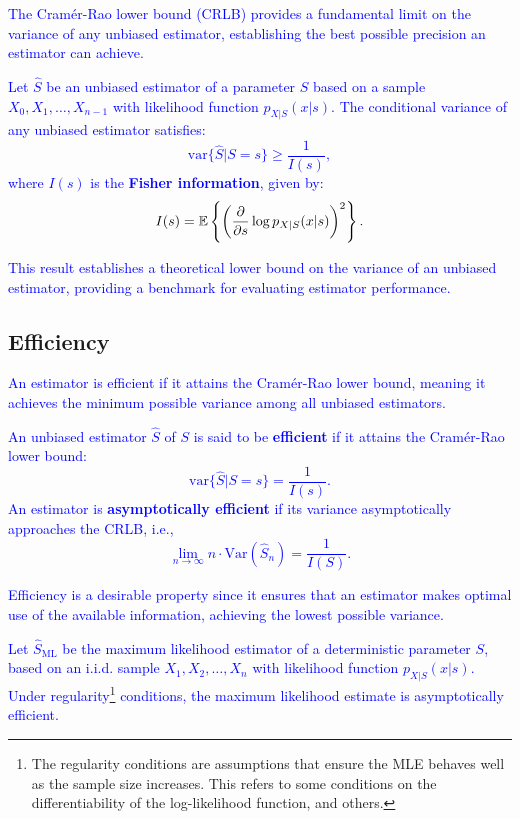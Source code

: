 \textcolor{blue}{The Cramér-Rao lower bound (CRLB) provides a fundamental limit on the variance of any unbiased estimator, establishing the best possible precision an estimator can achieve.
\begin{theorem}
Let $\hat{S}$ be an unbiased estimator of a parameter $S$ based on a sample $X_0, X_1, \dots, X_{n-1}$ with likelihood function $p_{X|S}(x|s)$. The conditional variance of any unbiased estimator satisfies:
\begin{equation}
\text{var}\{\hat{S}|S=s\} \geq \frac{1}{I(s)},
\end{equation}
where $I(s)$ is the \textbf{Fisher information}, given by:
\begin{equation}
I(s) = \mathbb{E} \left\{ \left( \frac{\partial}{\partial s} \log p_{X|S}(x|s) \right)^2 \right\}.
\end{equation}
\end{theorem}
This result establishes a theoretical lower bound on the variance of an unbiased estimator, providing a benchmark for evaluating estimator performance.}

\subsection{Efficiency}

\textcolor{blue}{An estimator is efficient if it attains the Cramér-Rao lower bound, meaning it achieves the minimum possible variance among all unbiased estimators.
\begin{definition}[Efficiency]
An unbiased estimator $\hat{S}$ of $S$ is said to be \textbf{efficient} if it attains the Cramér-Rao lower bound:
\begin{equation}
\text{var}\{\hat{S}|S=s\} = \frac{1}{I(s)}.
\end{equation}
An estimator is \textbf{asymptotically efficient} if its variance asymptotically approaches the CRLB, i.e.,
\begin{equation}
\lim_{n \to \infty} n \cdot \text{Var}(\hat{S}_n) = \frac{1}{I(S)}.
\end{equation}
\end{definition}
Efficiency is a desirable property since it ensures that an estimator makes optimal use of the available information, achieving the lowest possible variance.
\begin{theorem}
Let \( \hat{S}_{\text{ML}} \) be the maximum likelihood estimator of a deterministic parameter \( S \), based on an i.i.d. sample \( X_1, X_2, \dots, X_n \) with likelihood function $p_{X|S}(x|s)$. Under regularity\footnote{The regularity conditions are assumptions that ensure the MLE behaves well as the sample size increases. This refers to some conditions on the differentiability of the log-likelihood function, and others.} conditions, the maximum likelihood estimate is asymptotically efficient.
\end{theorem}
}
